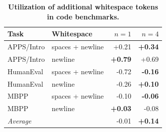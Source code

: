 \begin{table}[H]
\centering
\caption{\textbf{Utilization of additional whitespace tokens in code benchmarks.}}
\label{tab:pause}
\begin{tabular}{llrr}
\toprule
Task  & Whitespace & $n = 1$      &  $n = 4$     \\
\midrule
APPS/Intro & spaces + newline &  +0.21 &  \textbf{+0.34} \\
APPS/Intro & newline  &  \textbf{+0.79} &  +0.69 \\
HumanEval & spaces + newline & -0.72 & \textbf{-0.16} \\
HumanEval & newline  & -0.26 &  \textbf{+0.10} \\
MBPP & spaces + newline & -0.10 & \textbf{-0.06} \\
MBPP & newline  &  \textbf{+0.03} & -0.08 \\
\midrule
\emph{Average} & & -0.01 & \textbf{+0.14} \\
\bottomrule
\end{tabular}
\end{table}
